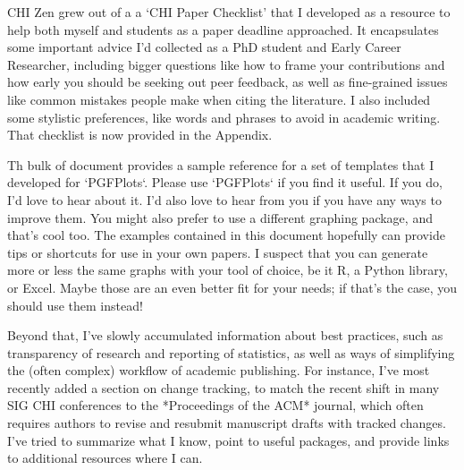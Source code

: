 \begin{markdown}
CHI Zen grew out of a a ‘CHI Paper Checklist’ that I developed as a resource to help both myself and students as a paper deadline approached. It encapsulates some important advice I'd collected as a PhD student and Early Career Researcher, including bigger questions like how to frame your contributions and how early you should be seeking out peer feedback, as well as fine-grained issues like common mistakes people make when citing the literature. I also included some stylistic preferences, like words and phrases to avoid in academic writing. That checklist is now provided in the Appendix.

Th bulk of document provides a sample reference for a set of templates that I developed for `PGFPlots`. Please use `PGFPlots` if you find it useful. If you do, I'd love to hear about it. I'd also love to hear from you if you have any ways to improve them. You might also prefer to use a different graphing package, and that's cool too. The examples contained in this document hopefully can provide tips or shortcuts for use in your own papers. I suspect that you can generate more or less the same graphs with your tool of choice, be it R, a Python library, or Excel. Maybe those are an even better fit for your needs; if that's the case, you should use them instead! 

Beyond that, I've slowly accumulated information about best practices, such as transparency of research and reporting of statistics, as well as ways of simplifying the (often complex) workflow of academic publishing. For instance, I've most recently added a section on change tracking, to match the recent shift in many SIG CHI conferences to the *Proceedings of the ACM* journal, which often requires authors to revise and resubmit manuscript drafts with tracked changes. I've tried to summarize what I know, point to useful packages, and provide links to additional resources where I can. 

\end{markdown}





